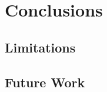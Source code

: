 \chapter{Conclusions}



\section{Limitations}
    
\clearpage

\section{Future Work}
    
\clearpage

%       
